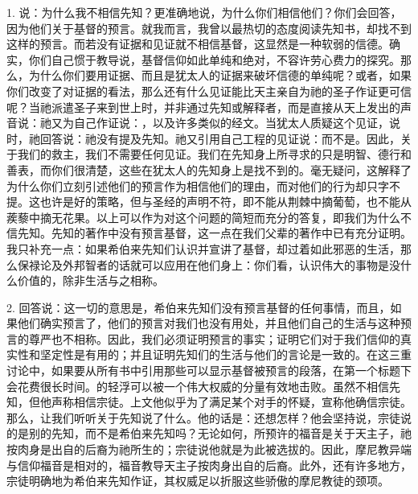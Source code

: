 1. 说：为什么我不相信先知？更准确地说，为什么你们相信他们？你们会回答，因为他们关于基督的预言。就我而言，我曾以最热切的态度阅读先知书，却找不到这样的预言。而若没有证据和见证就不相信基督，这显然是一种软弱的信德。确实，你们自己惯于教导说，基督信仰如此单纯和绝对，不容许劳心费力的探究。那么，为什么你们要用证据、而且是犹太人的证据来破坏信德的单纯呢？或者，如果你们改变了对证据的看法，那么还有什么见证能比天主亲自为祂的圣子作证更可信呢？当祂派遣圣子来到世上时，并非通过先知或解释者，而是直接从天上发出的声音说：祂又为自己作证说：，以及许多类似的经文。当犹太人质疑这个见证，说时，祂回答说：祂没有提及先知。祂又引用自己工程的见证说：而不是。因此，关于我们的救主，我们不需要任何见证。我们在先知身上所寻求的只是明智、德行和善表，而你们很清楚，这些在犹太人的先知身上是找不到的。毫无疑问，这解释了为什么你们立刻引述他们的预言作为相信他们的理由，而对他们的行为却只字不提。这也许是好的策略，但与圣经的声明不符，即不能从荆棘中摘葡萄，也不能从蒺藜中摘无花果。以上可以作为对这个问题的简短而充分的答复，即我们为什么不信先知。先知的著作中没有预言基督，这一点在我们父辈的著作中已有充分证明。我只补充一点：如果希伯来先知们认识并宣讲了基督，却过着如此邪恶的生活，那么保禄论及外邦智者的话就可以应用在他们身上：你们看，认识伟大的事物是没什么价值的，除非生活与之相称。\par

2. 回答说：这一切的意思是，希伯来先知们没有预言基督的任何事情，而且，如果他们确实预言了，他们的预言对我们也没有用处，并且他们自己的生活与这种预言的尊严也不相称。因此，我们必须证明预言的事实；证明它们对于我们信仰的真实性和坚定性是有用的；并且证明先知们的生活与他们的言论是一致的。在这三重讨论中，如果要从所有书中引用那些可以显示基督被预言的段落，在第一个标题下会花费很长时间。的轻浮可以被一个伟大权威的分量有效地击败。虽然不相信先知，但他声称相信宗徒。上文他似乎为了满足某个对手的怀疑，宣称他确信宗徒。那么，让我们听听关于先知说了什么。他的话是：还想怎样？他会坚持说，宗徒说的是别的先知，而不是希伯来先知吗？无论如何，所预许的福音是关于天主子，祂按肉身是出自的后裔为祂所生的；宗徒说他就是为此被选拔的。因此，摩尼教异端与信仰福音是相对的，福音教导天主子按肉身出自的后裔。此外，还有许多地方，宗徒明确地为希伯来先知作证，其权威足以折服这些骄傲的摩尼教徒的颈项。\par

